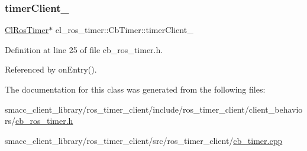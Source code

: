 \mbox{\label{classcl__ros__timer_1_1CbTimer_aefff167dbfbc54485f700a2c6b2479a5}} 
\subsubsection{\texorpdfstring{timer\+Client\+\_\+}{timerClient\_}}
{\footnotesize\ttfamily \hyperlink{classcl__ros__timer_1_1ClRosTimer}{Cl\+Ros\+Timer}$\ast$ cl\+\_\+ros\+\_\+timer\+::\+Cb\+Timer\+::timer\+Client\+\_\+\hspace{0.3cm}{\ttfamily [private]}}



Definition at line 25 of file cb\+\_\+ros\+\_\+timer.\+h.



Referenced by on\+Entry().



The documentation for this class was generated from the following files\+:\begin{DoxyCompactItemize}
\item 
smacc\+\_\+client\+\_\+library/ros\+\_\+timer\+\_\+client/include/ros\+\_\+timer\+\_\+client/client\+\_\+behaviors/\hyperlink{cb__ros__timer_8h}{cb\+\_\+ros\+\_\+timer.\+h}\item 
smacc\+\_\+client\+\_\+library/ros\+\_\+timer\+\_\+client/src/ros\+\_\+timer\+\_\+client/\hyperlink{cb__timer_8cpp}{cb\+\_\+timer.\+cpp}\end{DoxyCompactItemize}

